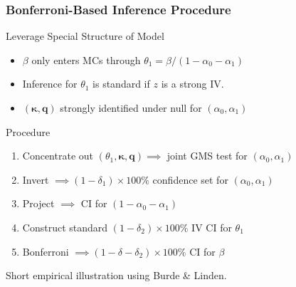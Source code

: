 \documentclass{beamer}
\begin{document}
%
%
\begin{frame}
  \frametitle{Bonferroni-Based Inference Procedure}
  

  \begin{block}{Leverage Special Structure of Model}
    \begin{itemize}
      \item $\beta$ only enters MCs through $\theta_1 = \beta/ (1 - \alpha_0 - \alpha_1)$
      \item Inference for $\theta_1$ is standard if $z$ is a strong IV. 
      \item $(\boldsymbol{\kappa}, \mathbf{q})$ strongly identified under null for $(\alpha_0, \alpha_1)$
    \end{itemize}

    \begin{block}{Procedure}
      \begin{enumerate}
        \item Concentrate out $(\theta_1, \boldsymbol{\kappa}, \boldsymbol{q}) \implies$ joint GMS test for $(\alpha_0, \alpha_1)$ 
        \item Invert $\implies (1 - \delta_1)\times 100\%$ confidence set for $(\alpha_0, \alpha_1)$
        \item Project $\implies$ CI for $(1 - \alpha_0 - \alpha_1)$
        \item Construct standard $(1 - \delta_2)\times 100\%$ IV CI for $\theta_1$
        \item Bonferroni $\implies (1 - \delta - \delta_2)\times 100\%$ CI for $\beta$
      \end{enumerate}
    \end{block}
    
  \end{block}
  
\end{frame}
\begin{frame}
Short empirical illustration using Burde \& Linden.
\end{frame}
\end{document}
